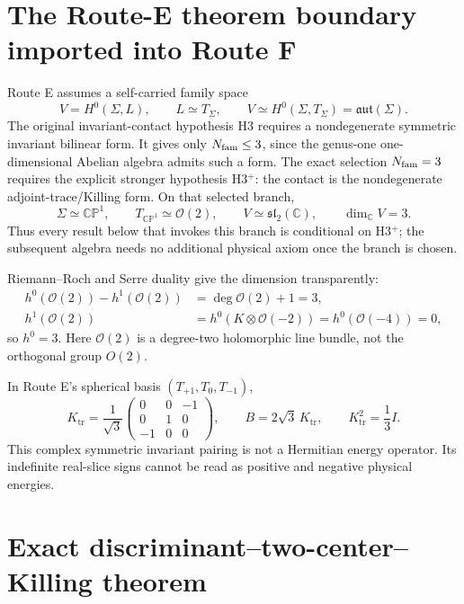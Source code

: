 \documentclass[11pt]{article}
\numberwithin{equation}{section}
\newcommand{\CP}{\mathbb{CP}}
\newcommand{\cO}{\mathcal O}
\newcommand{\sltwo}{\mathfrak{sl}_2(\mathbb C)}
\newcommand{\Ktr}{K_{\mathrm{tr}}}
\begin{document}
\section{The Route-E theorem boundary imported into Route F}

Route E assumes a self-carried family space
\begin{equation}
 V=H^0(\Sigma,L),\qquad L\simeq T_\Sigma,
 \qquad V\simeq H^0(\Sigma,T_\Sigma)=\mathfrak{aut}(\Sigma).
 \label{eq:selfcarried}
\end{equation}
The original invariant-contact hypothesis H3 requires a nondegenerate
symmetric invariant bilinear form.  It gives only \(N_{\rm fam}\le3\), since
the genus-one one-dimensional Abelian algebra admits such a form.  The exact
selection \(N_{\rm fam}=3\) requires the explicit stronger hypothesis H3$^+$:
the contact is the nondegenerate adjoint-trace/Killing form.  On that selected
branch,
\begin{equation}
 \Sigma\simeq\CP^1,\qquad T_{\CP^1}\simeq\cO(2),\qquad
 V\simeq\sltwo,\qquad \dim_{\mathbb C}V=3.
 \label{eq:routeEbranch}
\end{equation}
Thus every result below that invokes this branch is conditional on H3$^+$;
the subsequent algebra needs no additional physical axiom once the branch is
chosen.

Riemann--Roch and Serre duality give the dimension transparently:
\begin{align}
 h^0(\cO(2))-h^1(\cO(2))&=\deg\cO(2)+1=3,\\
 h^1(\cO(2))&=h^0(K\otimes\cO(-2))=h^0(\cO(-4))=0,
\end{align}
so \(h^0=3\).  Here \(\cO(2)\) is a degree-two holomorphic line bundle, not
the orthogonal group \(O(2)\).

In Route E's spherical basis \((T_{+1},T_0,T_{-1})\),
\begin{equation}
 \Ktr=\frac1{\sqrt3}
 \begin{pmatrix}
 0&0&-1\\[2pt]
 0&1&0\\[2pt]
 -1&0&0
 \end{pmatrix},
 \qquad B=2\sqrt3\,\Ktr,
 \qquad \Ktr^2=\frac13 I.
 \label{eq:Ktr}
\end{equation}
This complex symmetric invariant pairing is not a Hermitian energy operator.
Its indefinite real-slice signs cannot be read as positive and negative
physical energies.

\section{Exact discriminant--two-center--Killing theorem}
\end{document}
